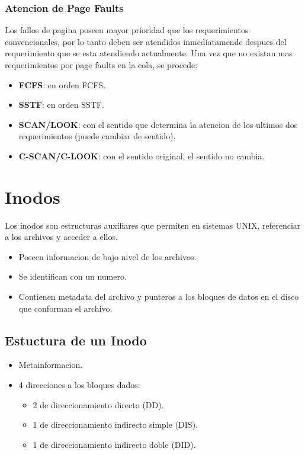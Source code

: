 \documentclass[12pt]{article}
\begin{document}
\subsubsection{Atencion de Page Faults}
Los fallos de pagina poseen mayor prioridad que los requerimientos convencionales, por lo tanto deben ser atendidos inmediatamende despues del requerimiento que se esta atendiendo actualmente.
Una vez que no existan mas requerimientos por page faults en la cola, se procede:
\begin{itemize}
    \item \textbf{FCFS}: en orden FCFS.
    \item \textbf{SSTF}: en orden SSTF.
    \item \textbf{SCAN/LOOK}: con el sentido que determina la atencion de los ultimos dos requerimientos (puede cambiar de sentido).
    \item \textbf{C-SCAN/C-LOOK}: con el sentido original, el sentido no cambia.
\end{itemize}


\section{Inodos}
Los inodos son estructuras auxiliares que permiten en sistemas UNIX, referenciar a los archivos y acceder a ellos.
\begin{itemize}
    \item Poseen informacion de bajo nivel de los archivos.
    \item Se identifican con un numero.
    \item Contienen metadata del archivo y punteros a los bloques de datos en el disco que conforman el archivo.
\end{itemize}

\subsection{Estuctura de un Inodo}
\begin{itemize}
    \item Metainformacion.
    \item 4 direcciones a los bloques dados:
        \begin{itemize}
            \item 2 de direccionamiento directo (DD).
            \item 1 de direccionamiento indirecto simple (DIS).
            \item 1 de direccionamiento indirecto doble (DID).
        \end{itemize}
\end{itemize}
\end{document}
